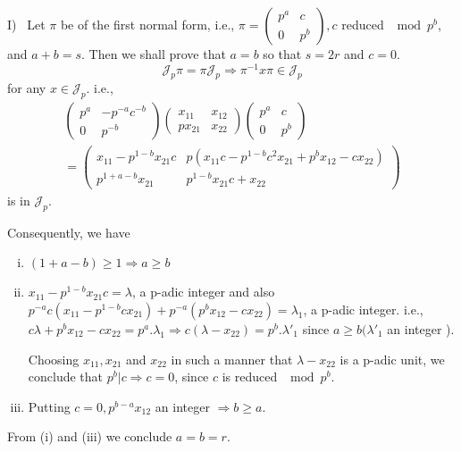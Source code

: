 I)~ Let $\pi$ be of the first normal form, i.e., $\pi
= \begin{pmatrix} p^a & c \\ 0 & p^b \end{pmatrix}, c $ reduced $\mod
p^b$, and $a + b = s$. Then we shall prove that $a = b$ so that $s = 2
r$ and $c = 0$. 
$$
\mathcal{J}_p \pi = \pi \mathcal{J}_p \Longrightarrow \pi^{-1} x \pi
\in \mathcal{J}_p 
$$ 
for any $x \in \mathcal{J}_p$. i.e.,
\begin{multline*}
\begin{pmatrix} p^a & -p^{-a}c^{-b} \\ 0 & p^{-b} \end{pmatrix} 
\begin{pmatrix} x_{11} & x_{12} \\ px_{21}&x_{22} \end{pmatrix}
\begin{pmatrix} p^a & c \\ 0 & p^b \end{pmatrix}\\
= \begin{pmatrix} 
  x_{11}- p^{1 - b} x_{21}c & p(x_{11} c - p^{1-b}
  c^2 x_{21} + p^b x_{12} - cx_{22}) \\ 
  p^{1 + a - b} x_{21} & p^{1- b} x_{21} c + x_{22} 
\end{pmatrix} 
\end{multline*}
is in $\mathcal{J}_p$.

Consequently, we have
\begin{enumerate}[i)]
\item $(1 + a - b) \ge 1 \Longrightarrow a \ge b$
\item $x_{11} - p^{1-b} x_{21} c= \lambda$, a p-adic integer and also
  $p^{-a} c (x_{11} - p^{1 - b} c x_{21}) + p^{-a} (p^b x_{12} -
  cx_{22}) = \lambda_1$, a p-adic integer. i.e., $c \lambda + p^b
  x_{12} - cx_{22} = p^a. \lambda_1 \Longrightarrow c (\lambda -
  x_{22}) = p^b.  \lambda'_1$ since $a \ge b (\lambda'_1$ an integer
  ). 
  
  Choosing $x_{11}, x_{21}$ and $x_{22}$ in such a manner that
  $\lambda - x_{22}$ is a p-adic unit, we conclude that $p^b | c
  \Longrightarrow c = 0$, since $c$ is reduced $\mod p^b$. 
\item Putting $c = 0, p^{b - a}x_{12}$ an integer $\Longrightarrow b \ge a$.
\end{enumerate}

From (i) and (iii) we conclude $a = b = r$.

